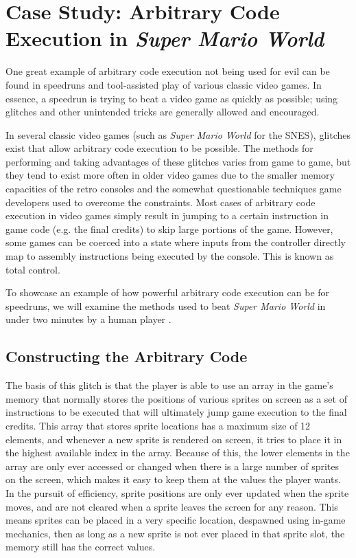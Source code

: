 \section{Case Study: Arbitrary Code Execution in \textit{Super Mario World}}

One great example of arbitrary code execution not being used for evil can be found in speedruns and tool-assisted play of various classic video games. In essence, a speedrun is trying to beat a video game as quickly as possible; using glitches and other unintended tricks are generally allowed and encouraged.

In several classic video games (such as \textit{Super Mario World} for the SNES), glitches exist that allow arbitrary code execution to be possible. The methods for performing and taking advantages of these glitches varies from game to game, but they tend to exist more often in older video games due to the smaller memory capacities of the retro consoles and the somewhat questionable techniques game developers used to overcome the constraints. Most cases of arbitrary code execution in video games simply result in jumping to a certain instruction in game code (e.g. the final credits) to skip large portions of the game. However, some games can be coerced into a state where inputs from the controller directly map to assembly instructions being executed by the console. This is known as total control.

To showcase an example of how powerful arbitrary code execution can be for speedruns, we will examine the methods used to beat \textit{Super Mario World} in under two minutes by a human player \cite{dotsarecool_2015}.

\subsection{Constructing the Arbitrary Code}

The basis of this glitch is that the player is able to use an array in the game's memory that normally stores the positions of various sprites on screen as a set of instructions to be executed that will ultimately jump game execution to the final credits. This array that stores sprite locations has a maximum size of 12 elements, and whenever a new sprite is rendered on screen, it tries to place it in the highest available index in the array. Because of this, the lower elements in the array are only ever accessed or changed when there is a large number of sprites on the screen, which makes it easy to keep them at the values the player wants. In the pursuit of efficiency, sprite positions are only ever updated when the sprite moves, and are not cleared when a sprite leaves the screen for any reason. This means sprites can be placed in a very specific location, despawned using in-game mechanics, then as long as a new sprite is not ever placed in that sprite slot, the memory still has the correct values.

